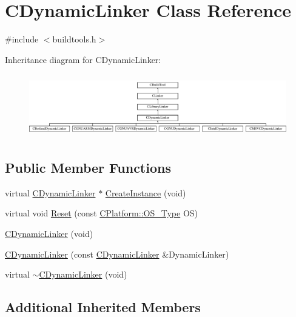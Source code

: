 \hypertarget{classCDynamicLinker}{\section{C\-Dynamic\-Linker Class Reference}
\label{classCDynamicLinker}
}


{\ttfamily \#include $<$buildtools.\-h$>$}

Inheritance diagram for C\-Dynamic\-Linker\-:\begin{figure}[H]
\begin{center}
\leavevmode
\includegraphics[height=2.794411cm]{d9/d8b/classCDynamicLinker}
\end{center}
\end{figure}
\subsection*{Public Member Functions}
\begin{DoxyCompactItemize}
\item 
virtual \hyperlink{classCDynamicLinker}{C\-Dynamic\-Linker} $\ast$ \hyperlink{classCDynamicLinker_ac71406ca5c6e8e991a6418a6307d274c}{Create\-Instance} (void)
\item 
virtual void \hyperlink{classCDynamicLinker_a437d46ee65b3585e7be9d15d40c26820}{Reset} (const \hyperlink{classCPlatform_a2fb735c63c53052f79629e338bb0f535}{C\-Platform\-::\-O\-S\-\_\-\-Type} O\-S)
\item 
\hyperlink{classCDynamicLinker_a533aff3d7d03c5a568b5a5dd2cbe969d}{C\-Dynamic\-Linker} (void)
\item 
\hyperlink{classCDynamicLinker_ad503d4979209cbcbeb573ef785197034}{C\-Dynamic\-Linker} (const \hyperlink{classCDynamicLinker}{C\-Dynamic\-Linker} \&Dynamic\-Linker)
\item 
virtual \hyperlink{classCDynamicLinker_a9bb607cf2014d3afe81b84974c83940b}{$\sim$\-C\-Dynamic\-Linker} (void)
\end{DoxyCompactItemize}
\subsection*{Additional Inherited Members}


